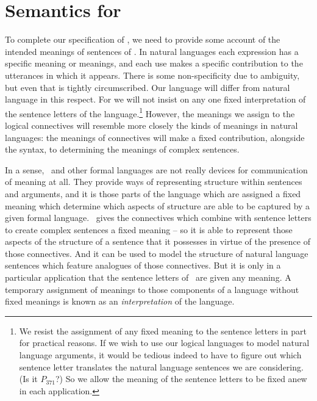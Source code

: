 


\section{Semantics for \texorpdfstring{\lone}{L1}}

To complete our specification of \lone, we need to provide some account of the intended meanings of sentences of \lone. In natural languages each expression has a specific meaning or meanings, and each use makes a specific contribution to the utterances in which it appears. There is some non-specificity due to ambiguity, but even that is tightly circumscribed.  Our language will differ from natural language in this respect. For we will not insist on any one fixed interpretation of the sentence letters of the language.\footnote{We resist the assignment of any fixed meaning to the sentence letters in part for practical reasons. If we wish to use our logical languages to model natural language arguments, it would be tedious indeed to have to figure out which sentence letter translates the natural language sentences we are considering. (Is it $P_{371}$?) So we allow the meaning of the sentence letters to be fixed anew in each application.} However, the meanings we assign to the logical connectives will resemble more closely the kinds of meanings in natural languages: the meanings of connectives will make a fixed contribution, alongside the syntax, to determining the meanings of complex sentences.

In a sense, \lone\ and other formal languages are not really devices for communication of meaning at all. They provide ways of representing structure within sentences and arguments, and it is those parts of the language which are assigned a fixed meaning which determine which aspects of structure are able to be captured by a given formal language. \lone\ gives the connectives which combine with sentence letters to create complex sentences a fixed meaning – so it is able to represent those aspects of the structure of a sentence that it possesses in virtue of the presence of those connectives. And it can be used to model the structure of natural language sentences which feature analogues of those connectives. But it is only in a particular application that the sentence letters of \lone\ are given any meaning. A temporary assignment of meanings to those components of a language without fixed meanings is known as an \emph{interpretation} of the language.


